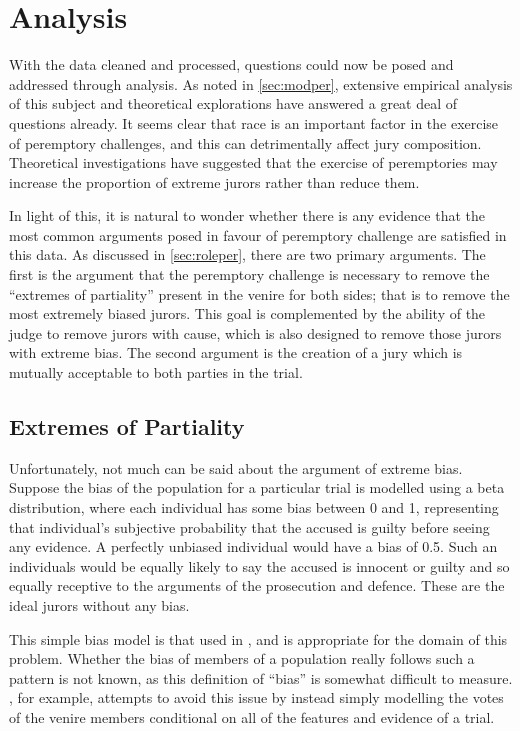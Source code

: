 \chapter{Analysis} \label{c:analysis}

With the data cleaned and processed, questions could now be posed and addressed through analysis.  As noted in \ref{sec:modper},
extensive empirical analysis of this subject and theoretical explorations have answered a great deal of questions already. It
seems clear that race is an important factor in the exercise of peremptory challenges, and this can detrimentally affect
jury composition. Theoretical investigations have suggested that the exercise of peremptories may increase the proportion of
extreme jurors rather than reduce them.

In light of this, it is natural to wonder whether there is any evidence that the most common arguments posed in favour of
peremptory challenge are satisfied in this data. As discussed in \ref{sec:roleper}, there are two primary arguments. The first is
the argument that the peremptory challenge is necessary to remove the ``extremes of partiality'' present in the venire for both
sides; that is to remove the most extremely biased jurors. This goal is complemented by the ability of the judge to remove jurors
with cause, which is also designed to remove those jurors with extreme bias. The second argument is the creation of a jury which
is mutually acceptable to both parties in the trial.

\section{Extremes of Partiality} \label{sec:extremes}

Unfortunately, not much can be said about the argument of extreme bias. Suppose the bias of the population for a particular
trial is modelled using a beta distribution, where each individual has some bias between 0 and 1, representing that
individual's subjective probability that the accused is guilty before seeing any evidence. A perfectly unbiased individual would
have a bias of 0.5. Such an individuals would be equally likely to say the accused is innocent or guilty and so equally receptive to the arguments of the
prosecution and defence. These are the ideal jurors without any bias.

This simple bias model is that used in \cite{ford2010}, and is appropriate for the domain of this problem. Whether the bias of
members of a population really follows such a pattern is not known, as this definition of ``bias'' is somewhat difficult to
measure. \cite{flanagan2015}, for example, attempts to avoid this issue by instead simply modelling the votes of the venire
members conditional on all of the features and evidence of a trial.

